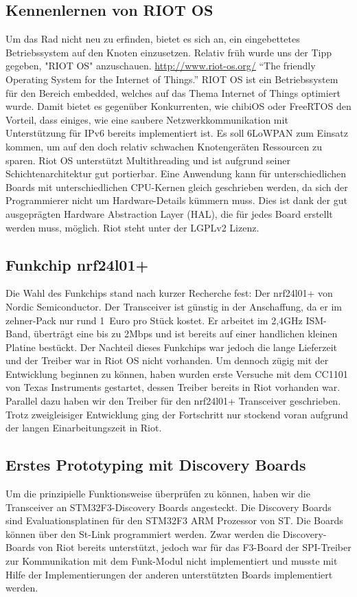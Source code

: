\documentclass{IEEEtran}
\begin{document}
    \subsection{Kennenlernen von RIOT OS}
    Um das Rad nicht neu zu erfinden, bietet es sich an, ein eingebettetes 
    Betriebssystem auf den Knoten einzusetzen. Relativ früh wurde uns der Tipp 
    gegeben, "RIOT OS" anzuschauen. \url{http://www.riot-os.org/} 
    \enquote{The friendly Operating System for the Internet of Things.}
    RIOT OS ist ein Betriebssystem für den Bereich embedded, welches auf das 
    Thema Internet of Things optimiert wurde. 
    Damit bietet es gegenüber Konkurrenten, wie chibiOS oder FreeRTOS den Vorteil, 
    dass einiges, wie eine saubere Netzwerkkommunikation mit Unterstützung für 
    IPv6 bereits implementiert ist. 
    Es soll 6LoWPAN zum Einsatz kommen, um auf den doch relativ schwachen 
    Knotengeräten Ressourcen zu sparen.
    Riot OS unterstützt Multithreading und ist aufgrund seiner Schichtenarchitektur
    gut portierbar. Eine Anwendung kann für unterschiedlichen Boards mit unterschiedlichen
    CPU-Kernen gleich geschrieben werden, da sich der Programmierer nicht um Hardware-Details
    kümmern muss. Dies ist dank der gut ausgeprägten Hardware Abstraction Layer (HAL), 
    die für jedes Board erstellt werden muss, möglich.
    Riot steht unter der LGPLv2 Lizenz.

    \subsection{Funkchip nrf24l01+}
    Die Wahl des Funkchips stand nach kurzer Recherche fest: Der nrf24l01+ von 
    Nordic Semiconductor. Der Transceiver ist günstig in der Anschaffung, da er 
    im zehner-Pack nur rund 1~Euro pro Stück kostet. Er arbeitet im 2,4GHz 
    ISM-Band, überträgt eine bis zu 2Mbps und ist bereits auf einer handlichen 
    kleinen Platine bestückt. Der Nachteil dieses Funkchips war jedoch die lange 
    Lieferzeit und der Treiber war in Riot OS nicht vorhanden.
    Um dennoch zügig mit der Entwicklung beginnen zu können, haben wurden erste 
    Versuche mit dem CC1101 von Texas Instruments gestartet, dessen Treiber 
    bereits in Riot vorhanden war. Parallel dazu haben wir den Treiber für den 
    nrf24l01+ Transceiver geschrieben. Trotz zweigleisiger Entwicklung ging der 
    Fortschritt nur stockend voran aufgrund der langen Einarbeitungszeit in Riot.

    \subsection{Erstes Prototyping mit Discovery Boards}
    Um die prinzipielle Funktionsweise überprüfen zu können, haben wir die 
    Transceiver an STM32F3-Discovery Boards angesteckt. Die Discovery Boards 
    sind Evaluationsplatinen für den STM32F3 ARM Prozessor von ST. Die Boards 
    können über den St-Link programmiert werden.
    Zwar werden die Discovery-Boards von Riot bereits unterstützt, jedoch war 
    für das F3-Board der SPI-Treiber zur Kommunikation mit dem Funk-Modul nicht 
    implementiert und musste mit Hilfe der Implementierungen der anderen 
    unterstützten Boards implementiert werden.
\end{document}
